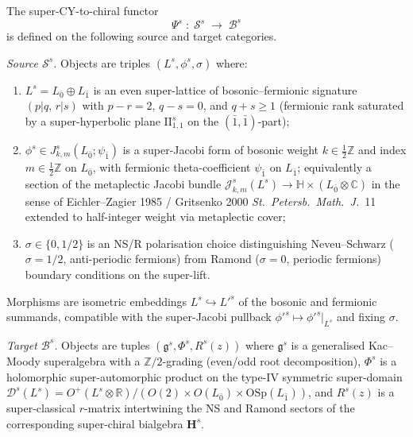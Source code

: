 \begin{definition}
\label{def:bkm-psi-super-functor}
The super-CY-to-chiral functor
\[
 \Psi^{s}\;\colon\;\mathcal S^{s}\;\longrightarrow\;\mathcal B^{s}
\]
is defined on the following source and target categories.

\emph{Source $\mathcal S^{s}$.} Objects are triples $(L^{s},\phi^{s},\sigma)$
where:
\begin{enumerate}[label=\textup{(S\arabic*)}]
\item $L^{s} = L_{\bar 0}\oplus L_{\bar 1}$ is an even super-lattice
of bosonic--fermionic signature $(p|q,\,r|s)$ with $p-r = 2$,
$q - s = 0$, and $q + s\ge 1$ (fermionic rank saturated by a
super-hyperbolic plane $\mathrm{II}_{1,1}^{s}$ on the
$(\bar 1,\bar 1)$-part);
\item $\phi^{s}\in J^{s}_{k,m}(L_{\bar 0};\psi_{\bar 1})$ is a
super-Jacobi form of bosonic weight $k\in\tfrac{1}{2}\mathbb Z$ and
index $m\in\tfrac{1}{2}\mathbb Z$ on $L_{\bar 0}$, with fermionic
theta-coefficient $\psi_{\bar 1}$ on $L_{\bar 1}$; equivalently a
section of the metaplectic Jacobi bundle
$\mathcal J^{s}_{k,m}(L^{s})\to\mathbb H\times(L_{\bar 0}\otimes\mathbb C)$
in the sense of Eichler--Zagier 1985 / Gritsenko 2000
\emph{St.\ Petersb.\ Math.\ J.}~11 extended to half-integer
weight via metaplectic cover;
\item $\sigma\in\{0,1/2\}$ is an NS/R polarisation choice
distinguishing Neveu--Schwarz ($\sigma = 1/2$, anti-periodic
fermions) from Ramond ($\sigma = 0$, periodic fermions)
boundary conditions on the super-lift.
\end{enumerate}
Morphisms are isometric embeddings $L^{s}\hookrightarrow L'^{s}$ of
the bosonic and fermionic summands, compatible with the
super-Jacobi pullback $\phi'^{s}\mapsto\phi'^{s}|_{L^{s}}$ and
fixing $\sigma$.

\emph{Target $\mathcal B^{s}$.} Objects are tuples
$(\mathfrak g^{s},\Phi^{s},R^{s}(z))$ where $\mathfrak g^{s}$ is a
generalised Kac--Moody superalgebra with a $\mathbb Z/2$-grading
(even/odd root decomposition), $\Phi^{s}$ is a holomorphic
super-automorphic product on the type-IV symmetric super-domain
$\mathcal D^{s}(L^{s}) = O^{+}(L^{s}\otimes\mathbb R)/(O(2)\times
O(L_{\bar 0})\times\mathrm{OSp}(L_{\bar 1}))$, and $R^{s}(z)$
is a super-classical $r$-matrix intertwining the NS and Ramond
sectors of the corresponding super-chiral bialgebra
$\mathbf H^{s}$.


\end{definition}
